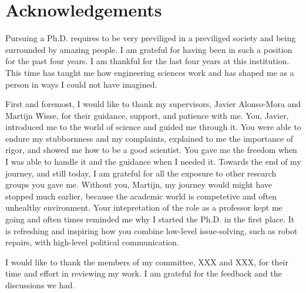 \chapter*{Acknowledgements}
\label{acknowledgements}



Pursuing a Ph.D. requires to be very previliged in a previliged society and
being surrounded by amazing people. I am grateful for having been in such a
position for the past four years. I am thankful for the last four years at this
institution. This time has taught me how engineering sciences work and has
shaped me as a person in ways I could not have imagined.

First and foremost, I would like to thank my supervisors, Javier Alonso-Mora and
Martijn Wisse, for their guidance, support, and patience with me. You, Javier,
introduced me to the world of science and guided me through it. You were able to
endure my stubbornness and my complaints, explained to me the importance of
rigor, and showed me how to be a good scientist. You gave me the freedom when I
was able to handle it and the guidance when I needed it. Towards the end of my
journey, and still today, I am grateful for all the exposure to other research
groups you gave me. Without you, Martijn, my journey would might have stopped
much earlier, because the academic world is competetive and often unhealthy
environment. Your intepretation of the role as a professor kept me going and
often times reminded me why I started the Ph.D. in the first place. It is
refreshing and inspiring how you combine low-level issue-solving, such as robot
repairs, with high-level political communication.

I would like to thank the members of my committee, XXX and
XXX, for their time and effort in reviewing my work. I am
grateful for the feedback and the discussions we had.

